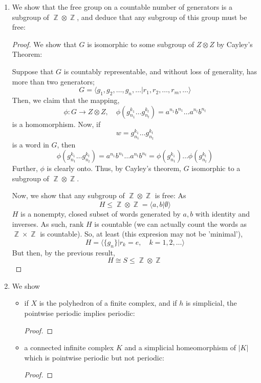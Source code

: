 \documentclass{book}
\DeclareMathOperator*{\Z}{\mathbb{Z}}
\newcommand\innerone[1]{\langle #1 \rangle}
\begin{document}
\begin{enumerate}[(1)]
    \item We show that the free group on a countable number of generators is a subgroup of $\Z \otimes \Z$, and deduce that any subgroup of this group must be free: 
        \begin{proof} We show that $G$ is isomorphic to some subgroup of $Z \otimes Z$ by Cayley's Theorem: 
            \par Suppose that $G$ is countably representable, and without loss of generality, has more than two generators;
            \[G = \innerone{g_1, g_2, \dots , g_n, \dots | r_1, r_2, \dots, r_m, \dots }\]
            Then, we claim that the mapping, 
            \[\phi: G \rightarrow Z \otimes Z, \quad \phi(g_{n_1}^{k_1}\dots g_{n_t}^{k_t}) = a^{n_1}b^{n_1} \dots a^{n_t}b^{n_t}\]
            is a homomorphism. Now, if 
            \[w = g_{n_1}^{k_1}\dots g_{n_t}^{k_t}\]
            is a word in $G$, then
            \[\phi(g_{n_1}^{k_1}\dots g_{n_t}^{k_t}) = a^{n_1}b^{n_1} \dots a^{n_t}b^{n_t} = \phi(g_{n_1}^{k_1}) \dots \phi(g_{n_t}^{k_t}) \]
            Further, $\phi$ is clearly onto. Thus, by Cayley's theorem, $G$ isomorphic to a subgroup of $\Z \otimes \Z$. 
            \par Now, we show that any subgroup of $\Z \otimes \Z$ is free: As
            \[H \leq \Z \otimes \Z = \innerone{a,b | \emptyset }\] 
            $H$ is a nonempty, closed subset of words generated by $a,b$ with identity and inverses. As such, $\text{rank } H$ is countable (we can actually count the words as $\Z \times \Z$ is countable). So, at least (this expresion may not be 'minimal'), 
            \[H = \innerone{\{g_n\} | r_k = e, \quad k = 1, 2, \dots }\]
            But then, by the previous result, 
            \[H \cong S \leq \Z \otimes \Z\]
        \end{proof}

    \item We show 
        \begin{itemize}
            \item if $X$ is the polyhedron of a finite complex, and if $h$ is simplicial, the pointwise periodic implies periodic: 
                \begin{proof}
                \end{proof}

            \item a connected infinite complex $K$ and a simplicial homeomorphism of $|K|$ which is pointwise periodic but not periodic: 
                \begin{proof}
                \end{proof}
        \end{itemize}


\end{enumerate}
\end{document}
